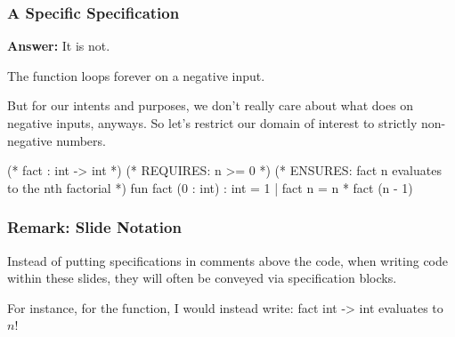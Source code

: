 \documentclass[aspectratio=169]{beamer}
\begin{document}
\begin{frame}[fragile]
  \frametitle{A Specific Specification}

  \textbf{Answer:} It is not.

  \pause
  \vspace{\fill}

  The  function loops forever on a negative input.

  \pause
  \vspace{\fill}

  But for our intents and purposes, we don't really
  care about what  does on negative inputs, anyways. So
  let's restrict our domain of interest to strictly non-negative
  numbers.

  \pause
  \vspace{\fill}

  \begin{codeblock}
    (* fact : int -> int *)
    (* REQUIRES: n >= 0 *)
    (* ENSURES: fact n evaluates to the nth factorial *)
    fun fact (0 : int) : int = 1
      | fact n = n * fact (n - 1)
  \end{codeblock}

  \pause
\end{frame}

\begin{frame}[fragile]
  \frametitle{Remark: Slide Notation}

  Instead of putting specifications in comments above the code, when
  writing code within these slides, they will often be conveyed via
  specification blocks.

  \vspace{\fill}

  For instance, for the  function, I would instead write:
  \spec
    {fact}
    {int -> int}
    {}
    { evaluates to $n!$}
\end{frame}


\end{document}
